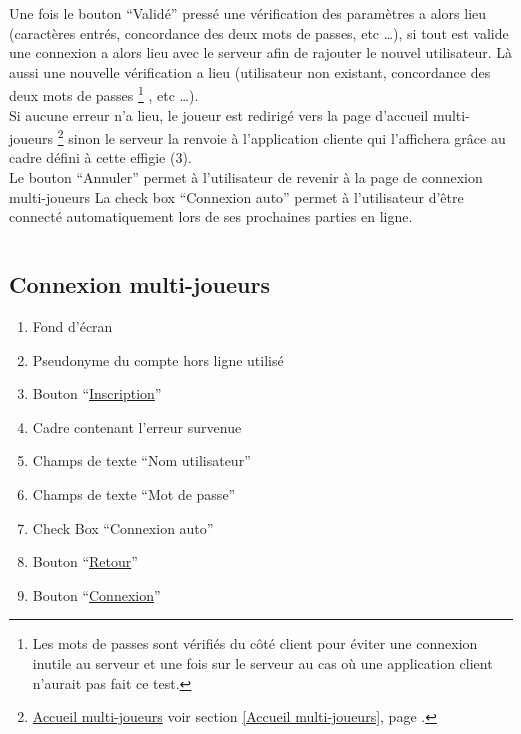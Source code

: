 \documentclass{report}
\begin{document}
		Une fois le bouton ``Validé'' pressé une vérification des paramètres a alors
		lieu (caractères entrés, concordance des deux mots de passes, etc \ldots), si
		tout est valide une connexion a alors lieu avec le serveur afin de rajouter le
		nouvel utilisateur.
		Là aussi une nouvelle vérification a lieu (utilisateur non existant,
		concordance des deux mots de passes%
		\footnote[1]{
			Les mots de passes sont vérifiés du côté client pour éviter une connexion
			inutile au serveur et une fois sur le serveur au cas où une application
			client n'aurait pas fait ce test.
		}
		, etc \ldots).\\
		Si aucune erreur n'a lieu, le joueur est redirigé vers la page d'accueil
		multi-joueurs%
		\footnote[2]{
			\hyperlink{Accueil multi-joueurs}{Accueil multi-joueurs}
			\og voir section \ref{Accueil multi-joueurs}, page \pageref{Accueil multi-joueurs}.\fg
		}
		sinon le serveur la renvoie à l'application cliente qui l'affichera grâce au
		cadre défini à cette effigie (3).\\
		Le bouton ``Annuler'' permet à l'utilisateur de revenir à la page de connexion
		multi-joueurs
		\footnotemark[1]
		La check box ``Connexion auto'' permet à l'utilisateur d'être connecté
		automatiquement lors de ses prochaines parties en ligne.
				
		$\,$
	
\newpage

	\subsection{Connexion multi-joueurs}
	
		\hypertarget{Connexion multi-joueurs}{}
		\label{Connexion multi-joueurs}
	
		
		
		\begin{enumerate}
		  \item Fond d'écran
		  \item Pseudonyme du compte hors ligne utilisé
		  \item Bouton ``\hyperlink{Creation compte multi-joueurs}{Inscription}''
		  \item Cadre contenant l'erreur survenue
		  \item Champs de texte ``Nom utilisateur''
		  \item Champs de texte ``Mot de passe''
		  \item Check Box ``Connexion auto''
		  \item Bouton ``\hyperlink{Page d'accueil}{Retour}''
		  \item Bouton ``\hyperlink{Accueil multi-joueurs}{Connexion}''
		\end{enumerate}
		
\end{document}
